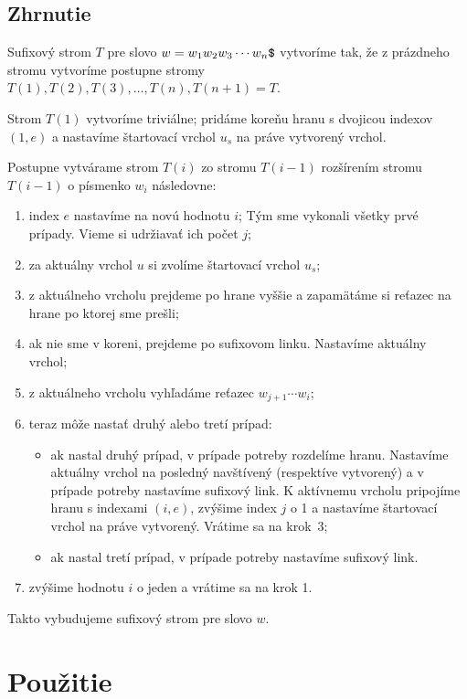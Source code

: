 \subsection{Zhrnutie}

Sufixový strom $T$ pre slovo $w = w_1w_2w_3\cdots w_n\hbox{\tt\$}$ vytvoríme tak, že z 
prázdneho stromu vytvoríme postupne stromy $T(1), T(2), T(3),\ldots, T(n), 
T(n+1) = T$. 

Strom $T(1)$ vytvoríme triviálne; pridáme koreňu hranu s dvojicou indexov 
$(1, e)$ a nastavíme štartovací vrchol $u_s$ na práve vytvorený vrchol.

Postupne vytvárame strom $T(i)$ zo stromu $T(i-1)$ rozšírením stromu 
$T(i-1)$ o písmenko $w_i$ následovne:

\begin{enumerate}
\item index $e$ nastavíme na novú hodnotu $i$; 
Tým sme vykonali všetky prvé prípady. Vieme si udržiavať ich počet $j$;
\item za aktuálny vrchol $u$ si zvolíme štartovací vrchol $u_s$;
\item z aktuálneho vrcholu prejdeme po hrane vyššie a zapamätáme si reťazec 
na hrane po ktorej sme prešli;
\item ak nie sme v koreni, prejdeme po sufixovom linku. Nastavíme aktuálny 
vrchol;
\item z aktuálneho vrcholu vyhľadáme reťazec $w_{j+1}\cdots w_i$;
\item teraz môže nastať druhý alebo tretí prípad:
\begin{itemize}
\item ak nastal druhý prípad, v prípade potreby rozdelíme hranu. Nastavíme 
aktuálny vrchol na posledný navštívený (respektíve vytvorený) a v prípade 
potreby nastavíme sufixový link. K aktívnemu vrcholu pripojíme hranu s 
indexami $(i,e)$, zvýšime index $j$ o 1 a nastavíme štartovací vrchol na 
práve vytvorený. Vrátime sa na krok~3;
\item ak nastal tretí prípad, v prípade potreby nastavíme sufixový link.
\end{itemize}
\item zvýšime hodnotu $i$ o jeden a vrátime sa na krok 1.
\end{enumerate}
 
Takto vybudujeme sufixový strom pre slovo $w$.

\section{Použitie}\label{sec:sx:usage}

